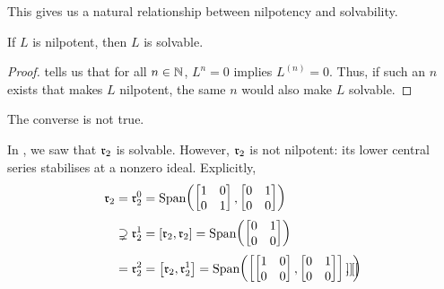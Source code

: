 This gives us a natural relationship between nilpotency and solvability.

\begin{boxcorollary}\label{Ch1:Cor:NilpotentImpliesSolvable}
    If $L$ is nilpotent, then $L$ is solvable.
\end{boxcorollary}
\begin{proof}
     tells us that for all $n \in \mathbb{N}$, $L^n = 0$ implies $L^{(n)} = 0$. Thus, if such an $n$ exists that makes $L$ nilpotent, the same $n$ would also make $L$ solvable.
\end{proof}

The converse is not true.

\begin{boxcexample}\label{Ch1:CEg:2D_NonAbelian_Lie_Algebra_solvable_not_nilpotent}
    In , we saw that $\mathfrak{r}_2$ is solvable. However, $\mathfrak{r}_2$ is not nilpotent: its lower central series stabilises at a nonzero ideal. Explicitly,
    \begin{align*}
        \mathfrak{r}_2 &= \mathfrak{r}_2^{0} = \operatorname{Span}\!\left( 
            \begin{bmatrix}
                1 & 0 \\ 0 & 1
            \end{bmatrix},
            \begin{bmatrix}
                0 & 1 \\ 0 & 0
            \end{bmatrix}
         \right) \\
        &\supsetneq \mathfrak{r}_2^{1} = \left[ \mathfrak{r}_2, \mathfrak{r}_2 \right] = \operatorname{Span}\!\left( 
            \begin{bmatrix}
                0 & 1 \\ 0 & 0
            \end{bmatrix}
         \right) \\
        &= \mathfrak{r}_2^{2} = \left[ \mathfrak{r}_2, \mathfrak{r}_2^1 \right] = \operatorname{Span}\!\left( 
            \left[ 
                \begin{bmatrix}
                    1 & 0 \\ 0 & 0
                \end{bmatrix},
                \begin{bmatrix}
                    0 & 1 \\ 0 & 0
                \end{bmatrix}
             \right], \left[ 
                \begin{bmatrix}

\end{bmatrix} \right] \right)
\end{align*}
\end{boxcexample}
